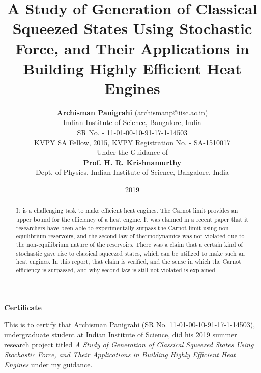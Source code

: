 \documentclass[12pt, twoside]{article}
\newcommand\blankpage{%
	\null
	\thispagestyle{empty}%
	\newpage}
\begin{document}
\setpagewiselinenumbers


\title{\textbf{A Study of Generation of Classical Squeezed States Using Stochastic Force, and Their Applications in Building Highly Efficient Heat Engines}}

\date{2019}



\author{
	\textbf{Archisman Panigrahi} \footnotesize(archismanp@iisc.ac.in) \\
	\footnotesize{Indian Institute of Science, Bangalore, India}\\
	\footnotesize SR No. - 11-01-00-10-91-17-1-14503\\
	\footnotesize KVPY SA Fellow, 2015, KVPY Registration No. - \underline{SA-1510017}\\
 	Under the Guidance of\\
	\textbf{Prof. H. R. Krishnamurthy}\\
	\footnotesize Dept. of Physics, Indian Institute of Science, Bangalore, India}


\maketitle

\begin{abstract}

It is a challenging task to make efficient heat engines. The Carnot limit \cite{resnick_halliday} provides an upper bound for the efficiency of a heat engine. It was claimed in a recent paper \cite{klaers} that it researchers have been able to experimentally surpass the Carnot limit using non-equilibrium reservoirs, and the second law of thermodynamics was not violated due to the non-equilibrium nature of the reservoirs. There was a claim that a certain kind of stochastic gave rise to classical squeezed states, which can be utilized to make such an heat engines. In this report, that claim is verified, and the sense in which the Carnot efficiency is surpassed, and why second law is still not violated is explained.

\end{abstract}


\afterpage{\blankpage}
\begin{center}
	\large{\textbf{Certificate}}
\end{center}
\vspace{2 cm}
This is to certify that Archisman Panigrahi (SR No. 11-01-00-10-91-17-1-14503),
undergraduate student at Indian Institute of Science, did his 2019 summer research
project titled \textit{A Study of Generation of Classical Squeezed
	States Using Stochastic Force, and Their
	Applications in Building Highly Efficient
	Heat Engines} under my guidance.\\\\\\
\end{document}

